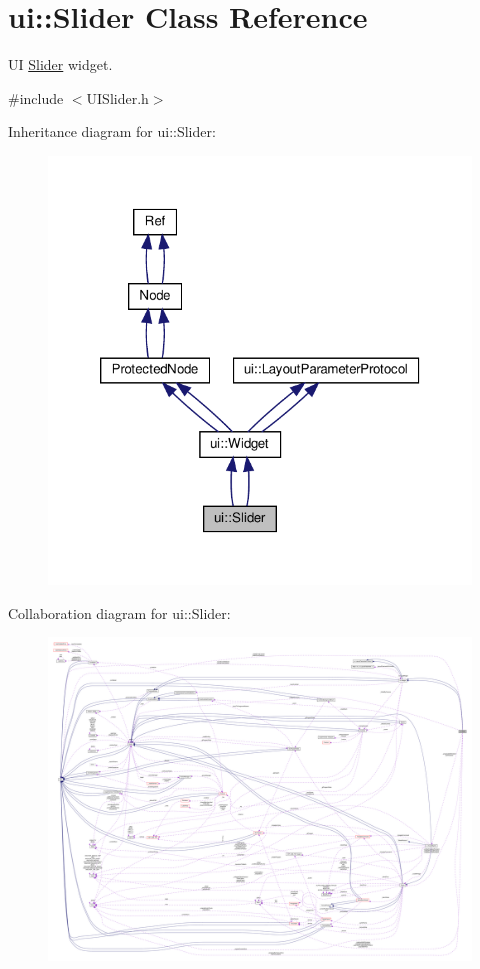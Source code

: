 \hypertarget{classui_1_1Slider}{}\section{ui\+:\+:Slider Class Reference}
\label{classui_1_1Slider}


UI \hyperlink{classui_1_1Slider}{Slider} widget.  




{\ttfamily \#include $<$U\+I\+Slider.\+h$>$}



Inheritance diagram for ui\+:\+:Slider\+:
\nopagebreak
\begin{figure}[H]
\begin{center}
\leavevmode
\includegraphics[width=320pt]{classui_1_1Slider__inherit__graph}
\end{center}
\end{figure}


Collaboration diagram for ui\+:\+:Slider\+:
\nopagebreak
\begin{figure}[H]
\begin{center}
\leavevmode
\includegraphics[width=350pt]{classui_1_1Slider__coll__graph}
\end{center}
\end{figure}
